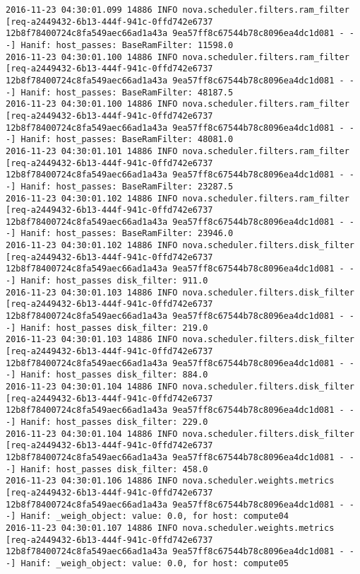 \begin{lstlisting}[frame=single, caption={The filter scheduler log trace for 10 virtual instances}, label={lst:filterschedulercodetracelog10vi}, escapechar=|]
2016-11-23 04:30:01.099 14886 INFO nova.scheduler.filters.ram_filter [req-a2449432-6b13-444f-941c-0ffd742e6737 12b8f78400724c8fa549aec66ad1a43a 9ea57ff8c67544b78c8096ea4dc1d081 - - -] Hanif: host_passes: BaseRamFilter: 11598.0
2016-11-23 04:30:01.100 14886 INFO nova.scheduler.filters.ram_filter [req-a2449432-6b13-444f-941c-0ffd742e6737 12b8f78400724c8fa549aec66ad1a43a 9ea57ff8c67544b78c8096ea4dc1d081 - - -] Hanif: host_passes: BaseRamFilter: 48187.5
2016-11-23 04:30:01.100 14886 INFO nova.scheduler.filters.ram_filter [req-a2449432-6b13-444f-941c-0ffd742e6737 12b8f78400724c8fa549aec66ad1a43a 9ea57ff8c67544b78c8096ea4dc1d081 - - -] Hanif: host_passes: BaseRamFilter: 48081.0
2016-11-23 04:30:01.101 14886 INFO nova.scheduler.filters.ram_filter [req-a2449432-6b13-444f-941c-0ffd742e6737 12b8f78400724c8fa549aec66ad1a43a 9ea57ff8c67544b78c8096ea4dc1d081 - - -] Hanif: host_passes: BaseRamFilter: 23287.5
2016-11-23 04:30:01.102 14886 INFO nova.scheduler.filters.ram_filter [req-a2449432-6b13-444f-941c-0ffd742e6737 12b8f78400724c8fa549aec66ad1a43a 9ea57ff8c67544b78c8096ea4dc1d081 - - -] Hanif: host_passes: BaseRamFilter: 23946.0
2016-11-23 04:30:01.102 14886 INFO nova.scheduler.filters.disk_filter [req-a2449432-6b13-444f-941c-0ffd742e6737 12b8f78400724c8fa549aec66ad1a43a 9ea57ff8c67544b78c8096ea4dc1d081 - - -] Hanif: host_passes disk_filter: 911.0
2016-11-23 04:30:01.103 14886 INFO nova.scheduler.filters.disk_filter [req-a2449432-6b13-444f-941c-0ffd742e6737 12b8f78400724c8fa549aec66ad1a43a 9ea57ff8c67544b78c8096ea4dc1d081 - - -] Hanif: host_passes disk_filter: 219.0
2016-11-23 04:30:01.103 14886 INFO nova.scheduler.filters.disk_filter [req-a2449432-6b13-444f-941c-0ffd742e6737 12b8f78400724c8fa549aec66ad1a43a 9ea57ff8c67544b78c8096ea4dc1d081 - - -] Hanif: host_passes disk_filter: 884.0
2016-11-23 04:30:01.104 14886 INFO nova.scheduler.filters.disk_filter [req-a2449432-6b13-444f-941c-0ffd742e6737 12b8f78400724c8fa549aec66ad1a43a 9ea57ff8c67544b78c8096ea4dc1d081 - - -] Hanif: host_passes disk_filter: 229.0
2016-11-23 04:30:01.104 14886 INFO nova.scheduler.filters.disk_filter [req-a2449432-6b13-444f-941c-0ffd742e6737 12b8f78400724c8fa549aec66ad1a43a 9ea57ff8c67544b78c8096ea4dc1d081 - - -] Hanif: host_passes disk_filter: 458.0
2016-11-23 04:30:01.106 14886 INFO nova.scheduler.weights.metrics [req-a2449432-6b13-444f-941c-0ffd742e6737 12b8f78400724c8fa549aec66ad1a43a 9ea57ff8c67544b78c8096ea4dc1d081 - - -] Hanif: _weigh_object: value: 0.0, for host: compute04
2016-11-23 04:30:01.107 14886 INFO nova.scheduler.weights.metrics [req-a2449432-6b13-444f-941c-0ffd742e6737 12b8f78400724c8fa549aec66ad1a43a 9ea57ff8c67544b78c8096ea4dc1d081 - - -] Hanif: _weigh_object: value: 0.0, for host: compute05

\end{lstlisting}
